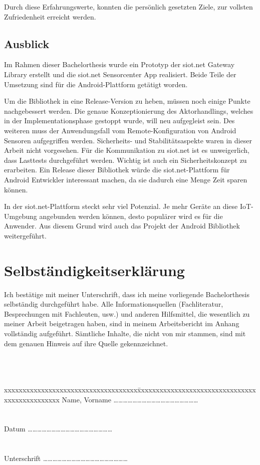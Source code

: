 Durch diese Erfahrungswerte, konnten die persönlich gesetzten Ziele, zur vollsten Zufriedenheit erreicht werden.

\section{Ausblick}
Im Rahmen dieser Bachelorthesis wurde ein Prototyp der siot.net Gateway Library erstellt und die siot.net Sensorcenter App realisiert. Beide Teile der Umsetzung sind für die Android-Plattform getätigt worden.

Um die Bibliothek in eine Release-Version zu heben, müssen noch einige Punkte nachgebessert werden. Die genaue Konzeptionierung des Aktorhandlings, welches in der Implementationsphase gestoppt wurde, will neu aufgegleist sein. Des weiteren muss der Anwendungsfall vom Remote-Konfiguration von Android Sensoren aufgegriffen werden. Sicherheits- und Stabilitätsaspekte waren in dieser Arbeit nicht vorgesehen. Für die Kommunikation zu siot.net ist es unweigerlich, dass Lasttests durchgeführt werden. Wichtig ist auch ein Sicherheitskonzept zu erarbeiten. Ein Release dieser Bibliothek würde die siot.net-Plattform für Android Entwickler interessant machen, da sie dadurch eine Menge Zeit sparen können.

In der siot.net-Plattform steckt sehr viel Potenzial. Je mehr Geräte an diese \gls{IoT}-Umgebung angebunden werden können, desto populärer wird es für die Anwender. Aus diesem Grund wird auch das Projekt der Android Bibliothek weitergeführt.

\chapter*{Selbständigkeitserklärung}
Ich bestätige mit meiner Unterschrift, dass ich meine vorliegende Bachelorthesis selbständig durchgeführt habe. Alle Informationsquellen (Fachliteratur, Besprechungen mit Fachleuten, usw.) und anderen Hilfsmittel, die wesentlich zu meiner Arbeit beigetragen haben, sind in meinem Arbeitsbericht im
Anhang vollständig aufgeführt. Sämtliche Inhalte, die nicht von mir stammen, sind mit dem genauen Hinweis auf ihre Quelle gekennzeichnet.\\\\\\\\


\begin{tabbing}
xxxxxxxxxxxxxxxxxxxxxxxxxxxxxxxxxxxx\=xxxxxxxxxxxxxxxxxxxxxxxxxxxxxxxxxxxxxxxxxxxxxxx \kill
Name, Vorname       \> ……………………………………………… \\\\\\
Datum               \> ……………………………………………… \\\\\\
Unterschrift        \> ……………………………………………… \\
\end{tabbing}
